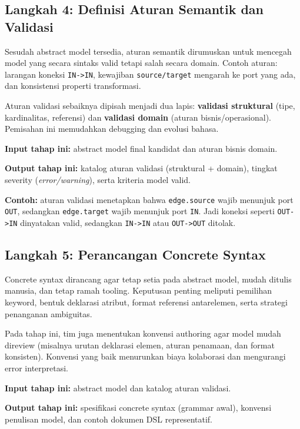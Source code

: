 \subsection{Langkah 4: Definisi Aturan Semantik dan Validasi}

Sesudah abstract model tersedia, aturan semantik dirumuskan untuk mencegah model yang secara sintaks valid tetapi salah secara domain. Contoh aturan: larangan koneksi \texttt{IN->IN}, kewajiban \texttt{source/target} mengarah ke port yang ada, dan konsistensi properti transformasi.

Aturan validasi sebaiknya dipisah menjadi dua lapis: \textbf{validasi struktural} (tipe, kardinalitas, referensi) dan \textbf{validasi domain} (aturan bisnis/operasional). Pemisahan ini memudahkan debugging dan evolusi bahasa.

\textbf{Input tahap ini:} abstract model final kandidat dan aturan bisnis domain.

\textbf{Output tahap ini:} katalog aturan validasi (struktural + domain), tingkat severity (\textit{error/warning}), serta kriteria model valid.

\textbf{Contoh:} aturan validasi menetapkan bahwa \texttt{edge.source} wajib menunjuk port \texttt{OUT}, sedangkan \texttt{edge.target} wajib menunjuk port \texttt{IN}. Jadi koneksi seperti \texttt{OUT->IN} dinyatakan valid, sedangkan \texttt{IN->IN} atau \texttt{OUT->OUT} ditolak.

\subsection{Langkah 5: Perancangan Concrete Syntax}

Concrete syntax dirancang agar tetap setia pada abstract model, mudah ditulis manusia, dan tetap ramah tooling. Keputusan penting meliputi pemilihan keyword, bentuk deklarasi atribut, format referensi antarelemen, serta strategi penanganan ambiguitas.

Pada tahap ini, tim juga menentukan konvensi authoring agar model mudah direview (misalnya urutan deklarasi elemen, aturan penamaan, dan format konsisten). Konvensi yang baik menurunkan biaya kolaborasi dan mengurangi error interpretasi.

\textbf{Input tahap ini:} abstract model dan katalog aturan validasi.

\textbf{Output tahap ini:} spesifikasi concrete syntax (grammar awal), konvensi penulisan model, dan contoh dokumen DSL representatif.

